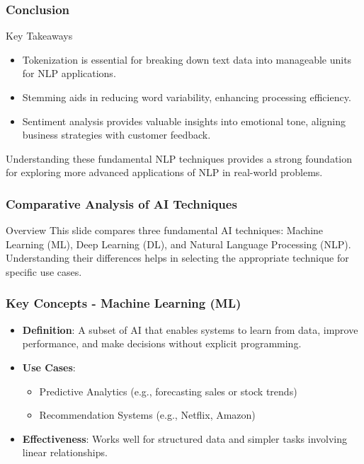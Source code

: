 \documentclass{beamer}
\begin{document}
\begin{frame}
    \frametitle{Conclusion}
    \begin{block}{Key Takeaways}
        \begin{itemize}
            \item Tokenization is essential for breaking down text data into manageable units for NLP applications.
            \item Stemming aids in reducing word variability, enhancing processing efficiency.
            \item Sentiment analysis provides valuable insights into emotional tone, aligning business strategies with customer feedback.
        \end{itemize}
    \end{block}
    Understanding these fundamental NLP techniques provides a strong foundation for exploring more advanced applications of NLP in real-world problems.
\end{frame}

\begin{frame}[fragile]
    \frametitle{Comparative Analysis of AI Techniques}
    \begin{block}{Overview}
        This slide compares three fundamental AI techniques: 
        Machine Learning (ML), Deep Learning (DL), and 
        Natural Language Processing (NLP). 
        Understanding their differences helps in selecting 
        the appropriate technique for specific use cases.
    \end{block}
\end{frame}

\begin{frame}[fragile]
    \frametitle{Key Concepts - Machine Learning (ML)}
    \begin{itemize}
        \item \textbf{Definition}: A subset of AI that enables systems 
        to learn from data, improve performance, and make decisions 
        without explicit programming.
        
        \item \textbf{Use Cases}:
        \begin{itemize}
            \item Predictive Analytics (e.g., forecasting sales or stock trends)
            \item Recommendation Systems (e.g., Netflix, Amazon)
        \end{itemize}
        
        \item \textbf{Effectiveness}: 
        Works well for structured data and simpler tasks 
        involving linear relationships.
    \end{itemize}
\end{frame}
\end{document}
